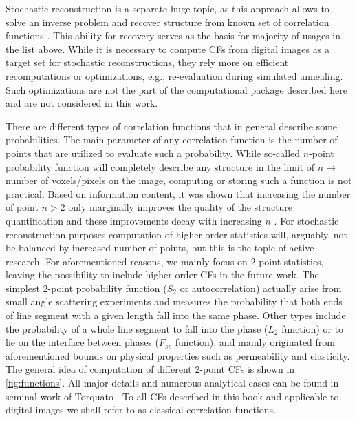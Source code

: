 \documentclass[reprint,amsmath,amssymb,aps,pre,showkeys,showpacs,nofootinbib]{revtex4-1}
\begin{document}
Stochastic reconstruction is a separate huge topic, as this approach allows to
solve an inverse problem and recover structure from known set of correlation
functions \cite{Adler_recon,Y-T,vcapek2009stochastic,hasanabadi20163d,Havelka,feng2018reconstruction,tahmasebiPRL,EPL2,thovert2011grain,tensorPRE}. This ability for recovery serves as the basis for majority of usages
in the list above. While it is necessary to compute CFs from digital images as a
target set for stochastic reconstructions, they rely more on efficient
recomputations or optimizations, e.g., re-evaluation during simulated
annealing. Such optimizations are not the part of the computational package described here and
are not considered in this work.

There are different types of correlation functions that in general describe some
probabilities. The main parameter of any correlation function is the number of
points that are utilized to evaluate such a probability. While so-called
$n$-point probability function \cite{Torquato_book} will completely describe any
structure in the limit of $n \rightarrow$ number of voxels/pixels on the image,
computing or storing such a function is not practical. Based on information
content, it was shown that increasing the number of point $n > 2$ only
marginally improves the quality of the structure quantification and these
improvements decay with increasing $n$ \cite{yao1993high,Gommes2}. For stochastic reconstruction purposes
computation of higher-order statistics will, arguably, not be balanced by
increased number of points, but this is the topic of active research. For
aforementioned reasons, we mainly focus on 2-point statistics, leaving the
possibility to include higher order CFs in the future work. The simplest 2-point
probability function ($S_2$ or autocorrelation) actually arise from small angle
scattering experiments and measures the probability that both ends of line
segment with a given length fall into the same phase. Other types include the
probability of a whole line segment to fall into the phase ($L_2$ function) or
to lie on the interface between phases ($F_{ss}$ function), and mainly originated
from aforementioned bounds on physical properties such as permeability and
elasticity. The general idea of computation of different 2-point CFs is shown in
\cref{fig:functions}. All major details and numerous analytical cases can be
found in seminal work of Torquato \cite{Torquato_book}. To all CFs described in this
book and applicable to digital images we shall refer to as classical correlation
functions.
\end{document}
